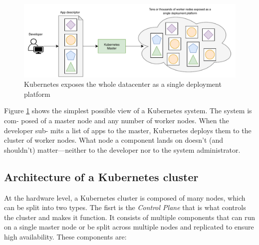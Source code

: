 \begin{figure}[htbp]
	\centering
	\includegraphics[width=\textwidth]{images/kubernetesmain.pdf}
	\caption{Kubernetes exposes the whole datacenter as a single deployment platform}
	\label{fig:kubernetesmain}
\end{figure}

Figure \ref{fig:kubernetesmain} shows the simplest possible view of a Kubernetes system. The system is com- posed of a master node and any number of worker nodes. When the developer sub- mits a list of apps to the master, Kubernetes deploys them to the cluster of worker nodes. What node a component lands on doesn’t (and shouldn’t) matter—neither to the developer nor to the system administrator.

\subsection{Architecture of a Kubernetes cluster}
At the hardware level, a Kubernetes cluster is composed of many nodes, which can be split into two types. 
The fisrt is the \textit{Control Plane} that is what controls the cluster and makes it function. It consists of multiple components that can run on a single master node or be split across multiple nodes and replicated to ensure high availability. These components are:

